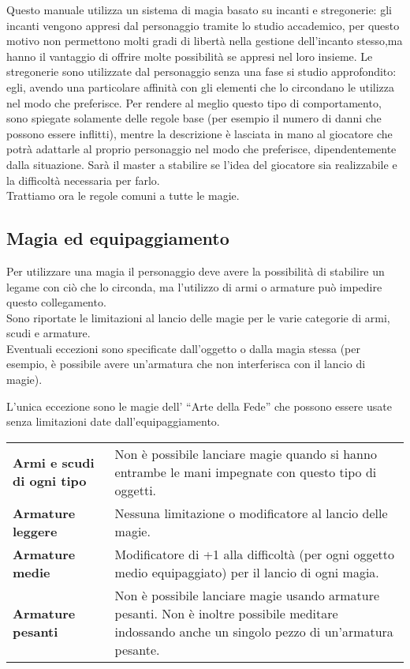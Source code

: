 \documentclass[../manuale_main.tex]{subfiles}
\begin{document}
Questo manuale utilizza un sistema di magia basato su incanti e stregonerie: gli incanti vengono appresi dal personaggio tramite lo studio accademico, per questo motivo non permettono molti gradi di libertà nella gestione dell'incanto stesso,ma hanno il vantaggio di offrire molte possibilità se appresi nel loro insieme. 
Le stregonerie sono utilizzate dal personaggio senza una fase si studio approfondito: egli, avendo una particolare affinità con gli elementi che lo circondano le utilizza nel modo che preferisce. Per rendere al meglio questo tipo di comportamento, sono spiegate solamente delle regole base (per esempio il numero di danni che possono essere inflitti), mentre la descrizione è lasciata in mano al giocatore che potrà adattarle al proprio personaggio nel modo che preferisce, dipendentemente dalla situazione. Sarà il master a stabilire se l’idea del giocatore sia realizzabile e la difficoltà necessaria per farlo.\\
Trattiamo ora le regole comuni a tutte le magie.\\


\subsection{Magia ed equipaggiamento}
Per utilizzare una magia il personaggio deve avere la possibilità di stabilire un legame con ciò che lo circonda, ma l'utilizzo di armi o armature può impedire questo collegamento.\\
Sono riportate le limitazioni al lancio delle magie per le varie categorie di armi, scudi e armature.\\
Eventuali eccezioni sono specificate dall'oggetto o dalla magia stessa (per esempio, è possibile avere un'armatura che non interferisca con il lancio di magie).

L'unica eccezione sono le magie dell' ``Arte della Fede'' che possono essere usate senza limitazioni date dall’equipaggiamento.
\renewcommand{\arraystretch}{1.5}
\begin{tabularx}{\linewidth}{l X}
\textbf{Armi e scudi di ogni tipo}&Non è possibile lanciare magie quando si hanno entrambe le mani impegnate con questo tipo di oggetti.\\
\textbf{Armature leggere}&Nessuna limitazione o modificatore al lancio delle magie.\\
\textbf{Armature medie}&Modificatore di +1 alla difficoltà (per ogni oggetto medio equipaggiato) per il lancio di ogni magia.\\
\textbf{Armature pesanti}&Non è possibile lanciare magie usando armature pesanti. Non è inoltre possibile meditare indossando anche un singolo pezzo di un'armatura pesante.\\
\end{tabularx}
\end{document}
